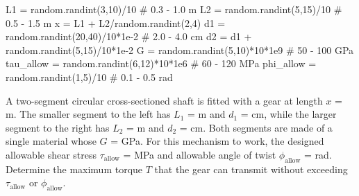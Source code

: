 \documentclass[
fontsize=10pt,
a4paper,
twosides=false,
open=any,
svgnames,
]{kaobook} %
\begin{document}
\begin{exercises}
  \begin{figure}[H]
    \centering
  \end{figure}

\begin{pycode}
L1 = random.randint(3,10)/10 # 0.3 - 1.0 m
L2 = random.randint(5,15)/10 # 0.5 - 1.5 m
x = L1 + L2/random.randint(2,4)
d1 = random.randint(20,40)/10*1e-2 # 2.0 - 4.0 cm
d2 = d1 + random.randint(5,15)/10*1e-2
G = random.randint(5,10)*10*1e9 # 50 - 100 GPa
tau_allow = random.randint(6,12)*10*1e6 # 60 - 120 MPa
phi_allow = random.randint(1,5)/10 # 0.1 - 0.5 rad
\end{pycode}

  \item A two-segment circular cross-sectioned shaft is fitted with a gear at length $x$ =  m. The smaller segment to the left has $L_{1}$ =  m and $d_{1}$ =  cm, while the larger segment to the right has $L_{2}$ =  m and $d_{2}$ =  cm. Both segments are made of a single material whose $G$ =  GPa. For this mechanism to work, the designed allowable shear stress $\tau_{\text{allow}}$ =  MPa and allowable angle of twist $\phi_{\text{allow}}$ =  rad. Determine the maximum torque $T$ that the gear can transmit without exceeding $\tau_{\text{allow}}$ or $\phi_{\text{allow}}$.


\end{exercises}
\end{document}
